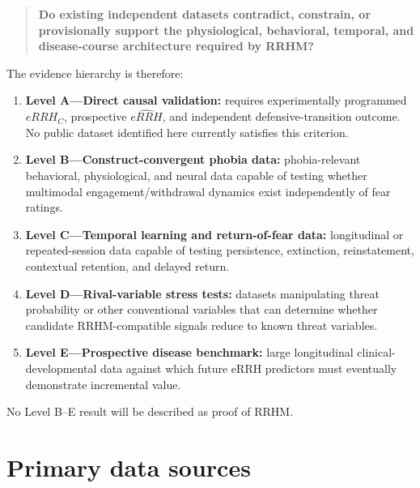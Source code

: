 \documentclass[11pt]{article}
\begin{document}
\begin{quote}
\textbf{Do existing independent datasets contradict, constrain, or provisionally support the physiological, behavioral, temporal, and disease-course architecture required by RRHM?}
\end{quote}

The evidence hierarchy is therefore:

\begin{enumerate}[leftmargin=2em]
\item \textbf{Level A---Direct causal validation:} requires experimentally programmed $eRRH_C$, prospective $\widehat{eRRH}$, and independent defensive-transition outcome. No public dataset identified here currently satisfies this criterion.
\item \textbf{Level B---Construct-convergent phobia data:} phobia-relevant behavioral, physiological, and neural data capable of testing whether multimodal engagement/withdrawal dynamics exist independently of fear ratings.
\item \textbf{Level C---Temporal learning and return-of-fear data:} longitudinal or repeated-session data capable of testing persistence, extinction, reinstatement, contextual retention, and delayed return.
\item \textbf{Level D---Rival-variable stress tests:} datasets manipulating threat probability or other conventional variables that can determine whether candidate RRHM-compatible signals reduce to known threat variables.
\item \textbf{Level E---Prospective disease benchmark:} large longitudinal clinical-developmental data against which future eRRH predictors must eventually demonstrate incremental value.
\end{enumerate}

No Level B--E result will be described as proof of RRHM.

\section{Primary data sources}
\end{document}
